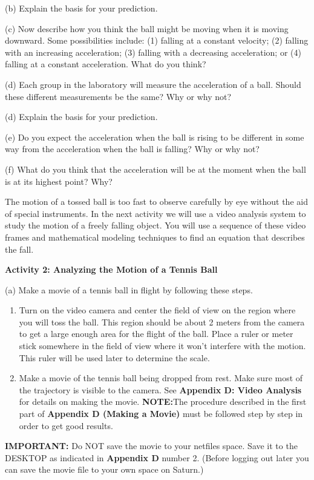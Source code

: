 (b) Explain the basis for your prediction.
\vspace{20mm}

(c) Now describe how you think the ball might be moving when it is moving downward. Some possibilities include: (1) falling at a constant velocity; (2) falling
with an increasing acceleration; (3) falling with a decreasing acceleration;
or (4) falling at a constant acceleration. What do you think?
\vspace{20mm}

(d) Each group in the laboratory will measure the acceleration of a ball. Should these different measurements be the same? Why or why not?
\vspace{20mm}

(d) Explain the basis for your prediction.
\vspace{20mm}

(e) Do you expect the acceleration when the ball is rising to be different in
some way from the acceleration when the ball is falling? Why or why not?
\vspace{20mm}

(f) What do you think that the acceleration will be at the moment when the ball
is at its highest point? Why?
\vspace{20mm}

The motion of a tossed ball is too fast to observe carefully by eye without
the aid of special instruments. In the next activity we will use a video analysis system to study the motion of a freely falling object. You will use a sequence of these video frames and mathematical modeling techniques to find an equation that describes the fall. 

\textbf{Activity 2: Analyzing the Motion of a Tennis Ball} 

(a) Make a movie of a tennis ball in flight by following these steps.

\begin{enumerate}
\item Turn on the video camera and center the field of view on the region where you will toss the ball. This region should be about 2 meters from the camera to
get a large enough area for the flight of the ball. Place a ruler or meter stick somewhere in the field of view where it won't interfere with the motion. This
ruler will be used later to determine the scale. 
\item Make a movie of the tennis ball being dropped from rest. Make sure most of the trajectory is visible to the camera. See \textbf{Appendix D: Video Analysis} for details on making the movie. \textbf{NOTE:}The procedure described in the first part of \textbf{Appendix D (Making a Movie)} must be followed step by step in order to get good results.
\end{enumerate}
\textbf{IMPORTANT:} Do NOT save the movie to your netfiles space.  Save it to the DESKTOP as indicated in \textbf{Appendix D} number 2.  (Before logging out later you can save the movie file to your own space on Saturn.)
\vspace{5mm}

